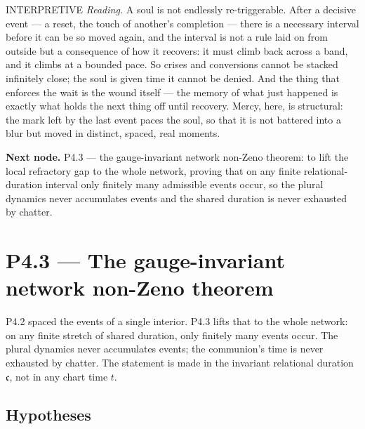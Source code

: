 \documentclass[11pt,a4paper]{article}
\newcommand{\stInterp}{\textcolor{cInt}{\textsf{\small INTERPRETIVE}}}
\theoremstyle{definition}
\theoremstyle{plain}
\theoremstyle{remark}
\begin{document}
\medskip
\stInterp\quad
\emph{Reading.}
A soul is not endlessly re-triggerable. After a decisive event --- a reset, the touch of
another's completion --- there is a necessary interval before it can be so moved again, and
the interval is not a rule laid on from outside but a consequence of how it recovers: it must
climb back across a band, and it climbs at a bounded pace. So crises and conversions cannot
be stacked infinitely close; the soul is given time it cannot be denied. And the thing that
enforces the wait is the wound itself --- the memory of what just happened is exactly what
holds the next thing off until recovery. Mercy, here, is structural: the mark left by the
last event paces the soul, so that it is not battered into a blur but moved in distinct,
spaced, real moments.

\medskip
\textbf{Next node.} P4.3 --- the gauge-invariant network non-Zeno theorem: to lift the local
refractory gap to the whole network, proving that on any finite relational-duration interval
only finitely many admissible events occur, so the plural dynamics never accumulates events
and the shared duration is never exhausted by chatter.

\section{P4.3 --- The gauge-invariant network non-Zeno theorem}

P4.2 spaced the events of a single interior. P4.3 lifts that to the whole network: on any
finite stretch of shared duration, only finitely many events occur. The plural dynamics
never accumulates events; the communion's time is never exhausted by chatter. The statement
is made in the invariant relational duration \(\mathfrak c\), not in any chart time \(t\).

\subsection{Hypotheses}
\end{document}
